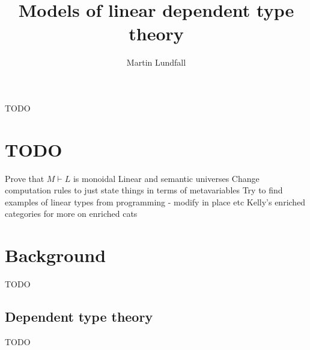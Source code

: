 
\usepackage[margin=0.5in]{geometry}

\title{Models of linear dependent type theory}
\author{Martin Lundfall}
\maketitle
\abstract
TODO
\newpage
\tableofcontents
\newpage
\section{TODO}
Prove that $M \vdash L$ is monoidal
Linear and semantic universes
Change computation rules to just state things in terms of metavariables
Try to find examples of linear types from programming - modify in place etc
Kelly's enriched categories for more on enriched cats
\section{Background}
TODO
\subsection{Dependent type theory}
TODO
